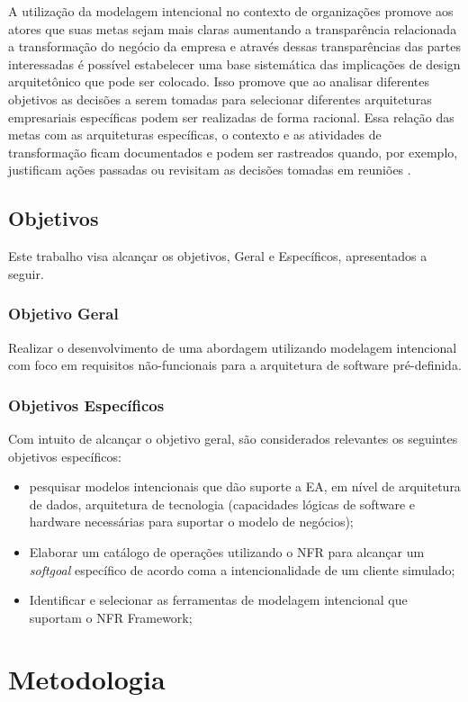 A utilização da modelagem intencional no contexto de organizações promove aos atores que suas metas sejam mais claras aumentando a transparência relacionada a transformação do negócio da empresa e através dessas transparências das partes interessadas é possível estabelecer uma base sistemática das implicações de design arquitetônico que pode ser colocado. Isso promove que ao analisar diferentes objetivos as decisões a serem tomadas para selecionar diferentes arquiteturas empresariais específicas podem ser realizadas de forma racional. Essa relação das metas com as arquiteturas específicas, o contexto e as atividades de transformação ficam documentados  e podem ser rastreados quando, por exemplo, justificam ações passadas ou revisitam as decisões tomadas em reuniões \cite{yu2006exploring}.

\section{Objetivos}

Este trabalho visa alcançar os objetivos, Geral e Específicos, apresentados a seguir.  

\subsection{Objetivo Geral}

Realizar o desenvolvimento de uma abordagem utilizando modelagem intencional com foco em requisitos não-funcionais para a arquitetura de software pré-definida. 

\subsection{Objetivos Específicos}

Com intuito de alcançar o objetivo geral, são considerados relevantes os seguintes objetivos específicos:

\begin{itemize}
	\item pesquisar modelos intencionais que dão suporte a EA, em nível de arquitetura de dados, arquitetura de tecnologia (capacidades lógicas de software e hardware necessárias para suportar o modelo de negócios);
	
	\item Elaborar um catálogo de operações utilizando o NFR para alcançar um \textit{softgoal} específico de acordo coma a intencionalidade de um cliente simulado;
	
	\item Identificar e selecionar as ferramentas de modelagem intencional que suportam o NFR Framework;
	
\end{itemize}

\chapter{Metodologia}